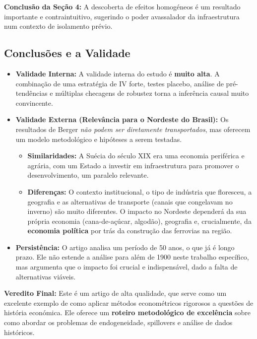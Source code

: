 \documentclass[12pt, a4paper]{article}
\begin{document}
\noindent\textbf{Conclusão da Seção 4:} A descoberta de efeitos homogéneos é um resultado importante e contraintuitivo, sugerindo o poder avassalador da infraestrutura num contexto de isolamento prévio.

\subsection{Conclusões e a Validade}
\begin{itemize}
    \item \textbf{Validade Interna:} A validade interna do estudo é \textbf{muito alta}. A combinação de uma estratégia de IV forte, testes placebo, análise de pré-tendências e múltiplas checagens de robustez torna a inferência causal muito convincente.
    \item \textbf{Validade Externa (Relevância para o Nordeste do Brasil):} Os resultados de Berger \textit{não podem ser diretamente transportados}, mas oferecem um modelo metodológico e hipóteses a serem testadas.
    \begin{itemize}
        \item \textbf{Similaridades:} A Suécia do século XIX era uma economia periférica e agrária, com um Estado a investir em infraestrutura para promover o desenvolvimento, um paralelo relevante.
        \item \textbf{Diferenças:} O contexto institucional, o tipo de indústria que floresceu, a geografia e as alternativas de transporte (canais que congelavam no inverno) são muito diferentes. O impacto no Nordeste dependerá da sua própria economia (cana-de-açúcar, algodão), geografia e, crucialmente, da \textbf{economia política} por trás da construção das ferrovias na região.
    \end{itemize}
    \item \textbf{Persistência:} O artigo analisa um período de 50 anos, o que já é longo prazo. Ele não estende a análise para além de 1900 neste trabalho específico, mas argumenta que o impacto foi crucial e indispensável, dado a falta de alternativas viáveis.
\end{itemize}

\noindent\textbf{Veredito Final:} Este é um artigo de alta qualidade, que serve como um excelente exemplo de como aplicar métodos econométricos rigorosos a questões de história económica. Ele oferece  um \textbf{roteiro metodológico de excelência} sobre como abordar os problemas de endogeneidade, spillovers e análise de dados históricos.
\end{document}
